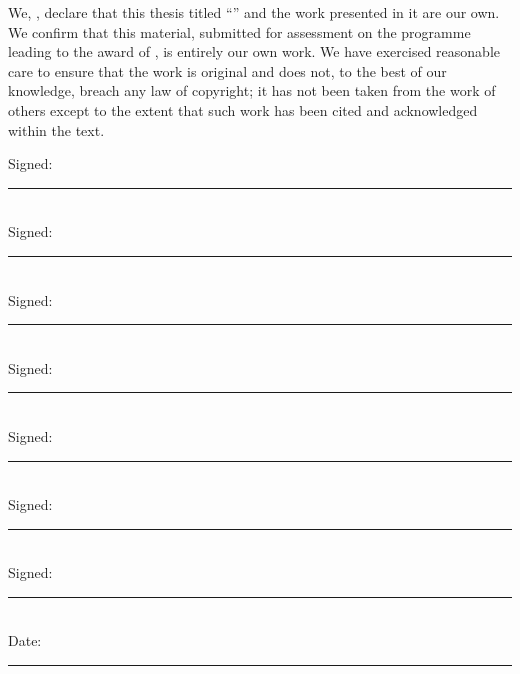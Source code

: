 \documentclass[11pt, a4paper, twoside, openright]{book}
\begin{document}
\begin{declaration}
\addchaptertocentry{\authorshipname}

\noindent We, \authorname, declare that this thesis titled
\enquote{\ttitle} and the work presented in it are our own.
We confirm that this material, submitted for assessment on the programme
leading to the award of \degreename, is entirely our own work.
We have exercised reasonable care to ensure that the work is original and
does not, to the best of our knowledge, breach any law of copyright; it has
not been taken from the work of others except to the extent that such work
has been cited and acknowledged within the text.

\vspace{2em}

\noindent Signed:\\ \rule[0.5em]{25em}{0.5pt}\\[0.3em]
\noindent Signed:\\ \rule[0.5em]{25em}{0.5pt}\\[0.3em]
\noindent Signed:\\ \rule[0.5em]{25em}{0.5pt}\\[0.3em]
\noindent Signed:\\ \rule[0.5em]{25em}{0.5pt}\\[0.3em]
\noindent Signed:\\ \rule[0.5em]{25em}{0.5pt}\\[0.3em]
\noindent Signed:\\ \rule[0.5em]{25em}{0.5pt}\\[0.3em]
\noindent Signed:\\ \rule[0.5em]{25em}{0.5pt}\\[0.6em]
\noindent Date:\\  \rule[0.5em]{25em}{0.5pt}

\end{declaration}

\begin{abstract}

\end{abstract}
\end{document}
